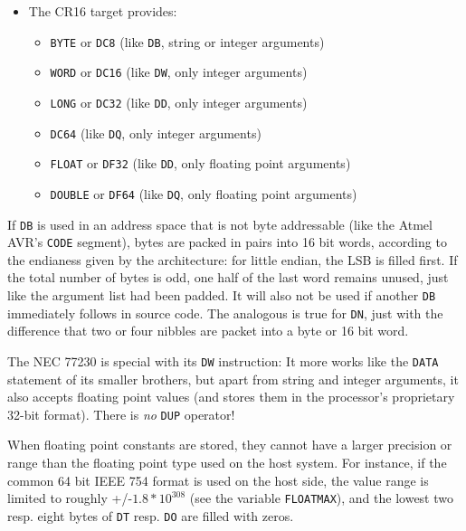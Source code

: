 \documentclass[12pt,twoside]{report}
\newcommand{\tty}[1]{{\tt #1}}
\begin{document}
\begin{itemize}
{\begin{itemize}
      \item{\tty{LWORD} (like \tty{DD}, only integer arguments)}
      \item{\tty{FLOAT} (like \tty{DD}, only floating point arguments)}
      \item{\tty{DOUBLE} (like \tty{DQ}, only floating point arguments)}
      \end{itemize}}
\item{The CR16 target provides:
      \begin{itemize}
      \item{\tty{BYTE} or \tty{DC8} (like \tty{DB}, string or integer arguments)}
      \item{\tty{WORD} or \tty{DC16} (like \tty{DW}, only integer arguments)}
      \item{\tty{LONG} or \tty{DC32} (like \tty{DD}, only integer arguments)}
      \item{\tty{DC64} (like \tty{DQ}, only integer arguments)}
      \item{\tty{FLOAT} or \tty{DF32} (like \tty{DD}, only floating point arguments)}
      \item{\tty{DOUBLE} or \tty{DF64} (like \tty{DQ}, only floating point arguments)}
      \end{itemize}}
\end{itemize}

If \tty{DB} is used in an address space that is not byte addressable (like
the Atmel AVR's \tty{CODE} segment), bytes are packed in pairs into 16 bit
words, according to the endianess given by the architecture: for little
endian, the LSB is filled first.  If the total number of bytes is odd, one
half of the last word remains unused, just like the argument list had been
padded.  It will also not be used if another \tty{DB} immediately follows
in source code.  The analogous is true for \tty{DN}, just with the difference
that two or four nibbles are packet into a byte or 16 bit word.

The NEC 77230 is special with its \tty{DW} instruction: It more works like
the \tty{DATA} statement of its smaller brothers, but apart from string
and integer arguments, it also accepts floating point values (and stores
them in the processor's proprietary 32-bit format). There is {\em no}
\tty{DUP} operator!

When floating point constants are stored, they cannot have a larger
precision or range than the floating point type used on the host system.
For instance, if the common 64 bit IEEE 754 format is used on the host side,
the value range is limited to roughly +/-$1.8*10^{308}$ (see the variable \tty{FLOATMAX}),
and the lowest two resp. eight bytes of \tty{DT} resp. \tty{DO} are filled
with zeros.
\end{document}
